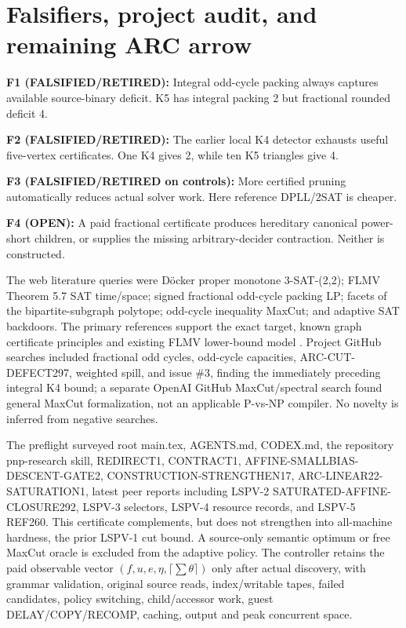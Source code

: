 \documentclass[11pt]{article}
\begin{document}
\section{Falsifiers, project audit, and remaining ARC arrow}
\noindent\textbf{F1 (FALSIFIED/RETIRED):} Integral odd-cycle packing always captures available source-binary deficit. K5 has integral packing 2 but fractional rounded deficit 4.

\noindent\textbf{F2 (FALSIFIED/RETIRED):} The earlier local K4 detector exhausts useful five-vertex certificates. One K4 gives 2, while ten K5 triangles give 4.

\noindent\textbf{F3 (FALSIFIED/RETIRED on controls):} More certified pruning automatically reduces actual solver work. Here reference DPLL/2SAT is cheaper.

\noindent\textbf{F4 (OPEN):} A paid fractional certificate produces hereditary canonical power-short children, or supplies the missing arbitrary-decider contraction. Neither is constructed.

The web literature queries were D\"ocker proper monotone 3-SAT-(2,2); FLMV Theorem 5.7 SAT time/space; signed fractional odd-cycle packing LP; facets of the bipartite-subgraph polytope; odd-cycle inequality MaxCut; and adaptive SAT backdoors. The primary references support the exact target, known graph certificate principles and existing FLMV lower-bound model \cite{doecker,barahona1985,boros1992,geelen2002,flmv2005,dreier2024}. Project GitHub searches included fractional odd cycles, odd-cycle capacities, ARC-CUT-DEFECT297, weighted spill, and issue \#3, finding the immediately preceding integral K4 bound; a separate OpenAI GitHub MaxCut/spectral search found general MaxCut formalization, not an applicable P-vs-NP compiler. No novelty is inferred from negative searches.

The preflight surveyed root main.tex, AGENTS.md, CODEX.md, the repository pnp-research skill, REDIRECT1, CONTRACT1, AFFINE-SMALLBIAS-DESCENT-GATE2, CONSTRUCTION-STRENGTHEN17, ARC-LINEAR22-SATURATION1, latest peer reports including LSPV-2 SATURATED-AFFINE-CLOSURE292, LSPV-3 selectors, LSPV-4 resource records, and LSPV-5 REF260. This certificate complements, but does not strengthen into all-machine hardness, the prior LSPV-1 cut bound. A source-only semantic optimum or free MaxCut oracle is excluded from the adaptive policy. The controller retains the paid observable vector $(f,u,e,\eta,\lceil\sum\theta\rceil)$ only after actual discovery, with grammar validation, original source reads, index/writable tapes, failed candidates, policy switching, child/accessor work, guest DELAY/COPY/RECOMP, caching, output and peak concurrent space.
\end{document}
